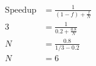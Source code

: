\documentclass[addpoints, 12pt, answers]{exam}
\begin{document}
\begin{questions}
\begin{parts}
        \begin{align*}
            \text{Speedup} & = \frac{1}{(1-f) + \frac{f}{N}} \\
            3              & = \frac{1}{0.2 + \frac{0.8}{N}} \\
            N              & = \frac{0.8}{1/3 - 0.2}         \\
            N              & =  6
        \end{align*}

    \end{parts}






\end{questions}
\end{document}
